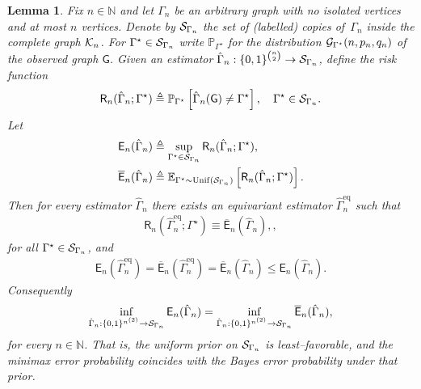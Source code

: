 \documentclass[12pt]{article}
\newtheorem{lemma}{Lemma}
\newcommand{\E}{\mathbb{E}}
\newcommand {\pr} {\mathbb{P}}
\newcommand{\calG}{{\cal G}}
\newcommand{\calK}{{\cal K}}
\newcommand{\calS}{{\cal S}}
\newcommand{\pp}[1]{\left[#1\right]}
\newcommand{\s}[1]{\mathsf{#1}}
\begin{document}
\begin{lemma}
\label{lem:WC=Bayes}
Fix $n\in\mathbb N$ and let $\Gamma_n$ be an arbitrary graph with no isolated vertices and at most $n$ vertices.
Denote by $\calS_{\Gamma_n}$ the set of (labelled) copies of\ $\Gamma_n$ inside the complete graph $\calK_n$. For $\Gamma^\star\in\calS_{\Gamma_n}$ write $\pr_{\Gamma^\star}$ for the distribution $\calG_{\Gamma^\star}(n,p_n,q_n)$ of the observed graph $\s{G}$. Given an estimator $\hat{\Gamma}_n:\{0,1\}^{\binom n2}\to\calS_{\Gamma_n}$, define the \emph{risk function}
\begin{align}
\s{R}_n(\hat{\Gamma}_n;\Gamma^\star)
      \triangleq
      \pr_{\Gamma^\star}
      \pp{\hat{\Gamma}_n(\s{G})\neq\Gamma^\star},
\quad
\Gamma^\star\in\calS_{\Gamma_n}.
\end{align}
Let
\begin{align}
\s E_n(\hat{\Gamma}_n)&\triangleq\sup_{\Gamma^\star\in\calS_{\Gamma_n}}
                           \s{R}_n(\hat{\Gamma}_n;\Gamma^\star),\\
\overline{\s E}_n(\hat{\Gamma}_n)&\triangleq
          \E_{\Gamma^\star\sim\mathrm{Unif}(\calS_{\Gamma_n})}
             \pp{\s{R}_n(\hat{\Gamma}_n;\Gamma^\star)}.
\end{align}
Then for every estimator $\hat{\Gamma}_n$ there exists an equivariant estimator
$\hat{\Gamma}_n^{\mathrm{eq}}$ such that 
\begin{align}
\label{eq:WC=Bayes-risk}
\s{R}_n(\hat{\Gamma}_n^{\mathrm{eq}};\Gamma^\star)
       \equiv \overline{\s E}_n(\hat{\Gamma}_n),
       ,
\end{align}
for all $\Gamma^\star\in\calS_{\Gamma_n}$, and
\begin{align}
    \s E_n(\hat{\Gamma}_n^{\mathrm{eq}})
       =\overline{\s E}_n(\hat{\Gamma}_n^{\mathrm{eq}})
        =\overline{\s E}_n(\hat{\Gamma}_n)
        \leq \s E_n(\hat{\Gamma}_n).\label{eqn:chinInEq}
\end{align}
Consequently
\begin{align}
      \inf_{\hat{\Gamma}_n:\{0,1\}^{n^{(2)}} \to \calS_{\Gamma_n}}\s E_n(\hat{\Gamma}_n)
      =
      \inf_{\hat{\Gamma}_n:\{0,1\}^{n^{(2)}} \to \calS_{\Gamma_n}}\overline{\s E}_n(\hat{\Gamma}_n),
\end{align}
for every $n\in\mathbb{N}$. That is, the uniform prior on $\calS_{\Gamma_n}$ is least–favorable, and the minimax error probability coincides with the Bayes error probability under that prior.
\end{lemma}
\end{document}
